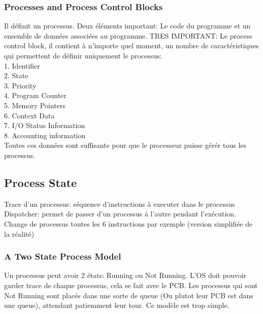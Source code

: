 \subsubsection{Processes and Process Control Blocks}
Il définit un processus.
Deux éléments important: Le code du programme et un ensemble de données associées au programme.
TRES IMPORTANT: Le process control block, il contient à n’importe quel moment, un nombre de caractéristiques qui permettent de définir uniquement le processus: \\
1. Identifier \\
2. State \\
3. Priority \\
4. Program Counter \\
5. Memory Pointers \\
6. Context Data \\
7. I/O Status Information \\
8. Accounting information \\
Toutes ces données sont suffisante pour que le processeur puisse gérér tous les processus.

\subsection{Process State}
Trace d’un processus: séquence d’instructions à executer dans le processus Dispatcher: permet de passer d’un processus à l’autre pendant l’exécution. Change de processus toutes les 6 instructions par exemple (version simplifiée de la réalité)
\subsubsection{A Two State Process Model}
Un processus peut avoir 2 états: Running ou Not Running. L’OS doit pouvoir garder trace de chaque processus, cela se fait avec le PCB. Les processus qui sont Not Running sont placés dans une sorte de queue (Ou plutot leur PCB est dans une queue), attendant patiemment leur tour. Ce modèle est trop simple.
